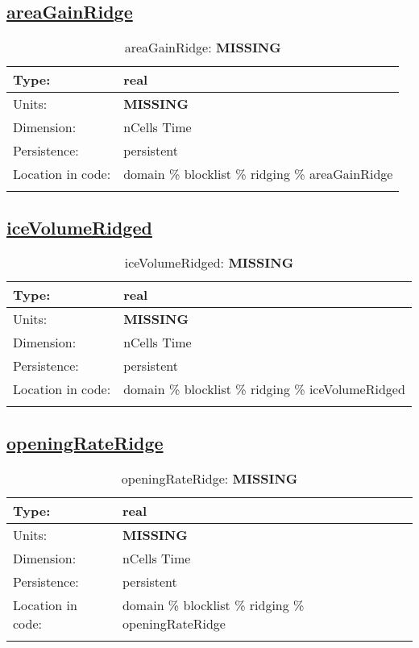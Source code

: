 \subsection[areaGainRidge]{\hyperref[sec:var_tab_ridging]{areaGainRidge}}
\label{subsec:var_sec_ridging_areaGainRidge}
\begin{center}
\begin{longtable}{| p{2.0in} | p{4.0in} |}
        \hline 
        Type: & real \\
        \hline 
        Units: & {\bf \color{red} MISSING} \\
        \hline 
        Dimension: & nCells Time \\
        \hline 
        Persistence: & persistent \\
        \hline 
         Location in code: & domain \% blocklist \% ridging \% areaGainRidge \\
         \hline 
    \caption{areaGainRidge: {\bf \color{red} MISSING}}
\end{longtable}
\end{center}
\subsection[iceVolumeRidged]{\hyperref[sec:var_tab_ridging]{iceVolumeRidged}}
\label{subsec:var_sec_ridging_iceVolumeRidged}
\begin{center}
\begin{longtable}{| p{2.0in} | p{4.0in} |}
        \hline 
        Type: & real \\
        \hline 
        Units: & {\bf \color{red} MISSING} \\
        \hline 
        Dimension: & nCells Time \\
        \hline 
        Persistence: & persistent \\
        \hline 
         Location in code: & domain \% blocklist \% ridging \% iceVolumeRidged \\
         \hline 
    \caption{iceVolumeRidged: {\bf \color{red} MISSING}}
\end{longtable}
\end{center}
\subsection[openingRateRidge]{\hyperref[sec:var_tab_ridging]{openingRateRidge}}
\label{subsec:var_sec_ridging_openingRateRidge}
\begin{center}
\begin{longtable}{| p{2.0in} | p{4.0in} |}
        \hline 
        Type: & real \\
        \hline 
        Units: & {\bf \color{red} MISSING} \\
        \hline 
        Dimension: & nCells Time \\
        \hline 
        Persistence: & persistent \\
        \hline 
         Location in code: & domain \% blocklist \% ridging \% openingRateRidge \\
         \hline 
    \caption{openingRateRidge: {\bf \color{red} MISSING}}
\end{longtable}
\end{center}
